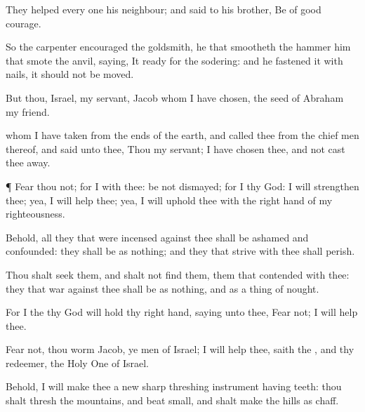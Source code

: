{They
helped every
one his
neighbour; and
{}
said to his
brother, Be of good
courage.

So the
carpenter
encouraged the
goldsmith,
{} he that
smootheth
{} the
hammer him that
smote the
anvil,
saying, It
{}
ready for the
sodering: and he
fastened it with
nails,
{} it should not be
moved.

But thou,
Israel,
{} my
servant,
Jacob whom I have
chosen, the
seed of
Abraham my
friend.

 whom I have
taken from the
ends of the
earth, and
called thee from the chief
men thereof, and
said unto thee, Thou
{} my
servant; I have
chosen thee, and not cast thee
away.


\par }{\PP {}¶
Fear thou not; for I
{} with thee: be not
dismayed; for I
{} thy
God: I will
strengthen thee; yea, I will
help thee; yea, I will
uphold thee with the right
hand of my
righteousness.

Behold, all they that were
incensed against thee shall be
ashamed and
confounded: they shall be as nothing; and
they that
strive with thee shall
perish.

Thou shalt
seek them, and shalt not
find them,
{}
them that
contended with thee: they that
war against thee shall be as nothing, and as a thing of
nought.

For I the
{} thy
God will
hold thy right
hand,
saying unto thee,
Fear not; I will
help thee.

Fear not, thou
worm
Jacob,
{} ye
men of
Israel; I will
help thee,
saith the
{}, and thy
redeemer, the Holy
One of
Israel.

Behold, I will
make thee a
new
sharp
threshing instrument
having
teeth: thou shalt
thresh the
mountains, and beat
{}
small, and shalt
make the
hills as
chaff.

}
